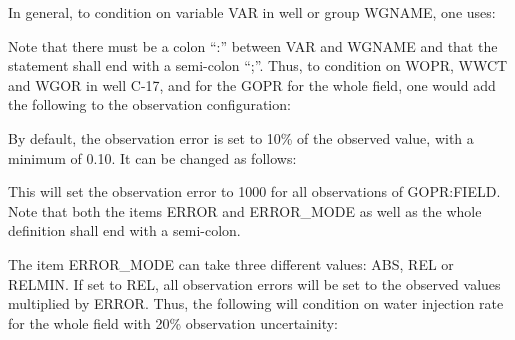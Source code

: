 \documentclass[letterpaper,10pt,english]{sphinxmanual}
\begin{document}
In general, to condition on variable VAR in well or group WGNAME, one
uses:

%
\begin{sphinxVerbatim}[commandchars=\\\{\}]
 
\end{sphinxVerbatim}

Note that there must be a colon “:” between VAR and WGNAME and that
the statement shall end with a semi-colon “;”. Thus, to condition on
WOPR, WWCT and WGOR in well C-17, and for the GOPR for the whole
field, one would add the following to the observation configuration:

%
\begin{sphinxVerbatim}[commandchars=\\\{\}]
 
 
 

 
\end{sphinxVerbatim}

By default, the observation error is set to 10\% of the observed value,
with a minimum of 0.10. It can be changed as follows:

%
\begin{sphinxVerbatim}[commandchars=\\\{\}]
 
           
      
\end{sphinxVerbatim}

This will set the observation error to 1000 for all observations of
GOPR:FIELD. Note that both the items ERROR and ERROR\_MODE as well as
the whole definition shall end with a semi-colon.

The item ERROR\_MODE can take three different values: ABS, REL or
RELMIN. If set to REL, all observation errors will be set to the
observed values multiplied by ERROR. Thus, the following will
condition on water injection rate for the whole field with 20\%
observation uncertainity:
\end{document}
